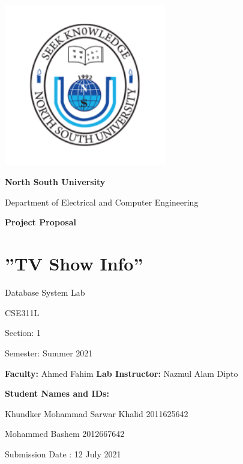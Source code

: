 \documentclass[]{article}
\date{}
\begin{document}
\begin{center}
\includegraphics[width=2.77778in,height=2.77778in]{./image1.png}

\textbf{North South University}

Department of Electrical and Computer Engineering

\textbf{Project Proposal}

\section{''TV Show Info'' }\label{tv-show-info}

Database System Lab

CSE311L

Section: 1

Semester: Summer 2021

\end{center}
\begin{flushleft}
\textbf{Faculty:} Ahmed Fahim \hspace{20mm}   \textbf{Lab Instructor:} Nazmul Alam Dipto
\vspace*{10px}
\vspace{10px}

\textbf{Student Names and IDs:}

Khundker Mohammad Sarwar Khalid 2011625642

Mohammed Bashem 2012667642
\end{flushleft}
\vspace*{5px}
\vspace{5px}
\begin{center}
Submission Date : 12 July 2021
\end{center}
\vspace*{30px}
\vspace{30px}
\end{document}
